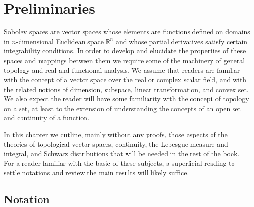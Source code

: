 \chapter{Preliminaries}

\begin{para}[Introduction]
  Sobolev spaces are vector spaces whose elements are
  functions defined on domains in $n$-dimensional Euclidean space $\mathbb{R}^n$
  and whose partial derivatives satisfy certain integrability conditions.
  In order to develop and elucidate the properties of these spaces and mappings
  between them we require some of the machinery of general topology
  and real and functional analysis.
  We assume that readers are familiar with the concept of a vector space over
  the real or complex scalar field, and with the related notions of dimension,
  subspace, linear transformation, and convex set.
  We also expect the reader will have some familiarity with the concept
  of topology on a set, at least to the extension of understanding
  the concepts of an open set and continuity of a function.

  In this chapter we outline, mainly without any proofs, those aspects
  of the theories of topological vector spaces,
  continuity, the Lebesgue measure and integral,
  and Schwarz distributions that will be needed in the rest of the book.
  For a reader familiar with the basic of these subjects,
  a superficial reading to settle notations and review the main results
  will likely suffice.
\end{para}


\section{Notation}


